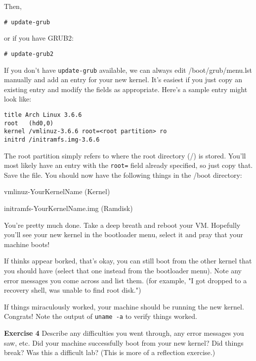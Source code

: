 \documentclass{article}
\begin{document}
Then, 
\begin{verbatim}# update-grub \end{verbatim} 

or if you have GRUB2:
\begin{verbatim}# update-grub2 \end{verbatim}


If you don't have \texttt{update-grub} available, we can always edit /boot/grub/menu.lst manually and add an entry for your new kernel. It's easiest if you just copy an existing entry and modify the fields as appropriate. 
Here's a sample entry might look like:

\begin{verbatim}
title Arch Linux 3.6.6  
root   (hd0,0)                                                                                             
kernel /vmlinuz-3.6.6 root=<root partition> ro
initrd /initramfs.img-3.6.6 
\end{verbatim}

The root partition simply refers to  where the root directory (/) is stored.
You'll most likely have an entry with the \texttt{root=} field already specified, so just copy that.
Save the file. You should now have the following things in the /boot directory: 


vmlinuz-YourKernelName          (Kernel)

initramfs-YourKernelName.img    (Ramdisk)


You're pretty much done. Take a deep breath and reboot your VM. Hopefully you'll see your new kernel in the bootloader menu, select it and pray that your machine boots! 

If thinks appear borked, that's okay, you can still boot from the other kernel that you should have (select that one instead from the bootloader menu). Note any error messages you come across and list them. (for example, "I got dropped to a recovery shell, was unable to find root disk.") 

If things miraculously worked, your machine should be running the new kernel. Congrats! Note the output of \texttt{uname -a} to verify things worked. 

{\bf Exercise 4} Describe any difficulties you went through, any error messages you saw, etc. Did your machine successfully boot from your new kernel? Did things break? Was this a difficult lab? (This is more of a reflection exercise.)
\end{document}
